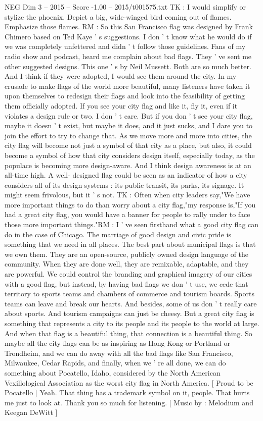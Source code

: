 \begin{textsample}{NEG Dim 3 – 2015 – Score -1.00 – 2015/t001575.txt}
TK : I would simplify or stylize the phoenix.
Depict a big, wide-winged bird coming out of flames.
Emphasize those flames.
RM : So this San Francisco flag was designed by Frank Chimero based on Ted Kaye ' s suggestions.
I don ' t know what he would do if we was completely unfettered and didn ' t follow those guidelines.
Fans of my radio show and podcast, heard me complain about bad flags.
They ' ve sent me other suggested designs.
This one ' s by Neil Mussett.
Both are so much better.
And I think if they were adopted, I would see them around the city.
In my crusade to make flags of the world more beautiful, many listeners have taken it upon themselves to redesign their flags and look into the feasibility of getting them officially adopted.
If you see your city flag and like it, fly it, even if it violates a design rule or two.
I don ' t care.
But if you don ' t see your city flag, maybe it doesn ' t exist, but maybe it does, and it just sucks, and I dare you to join the effort to try to change that.
As we move more and more into cities, the city flag will become not just a symbol of that city as a place, but also, it could become a symbol of how that city considers design itself, especially today, as the populace is becoming more design-aware.
And I think design awareness is at an all-time high.
A well- designed flag could be seen as an indicator of how a city considers all of its design systems : its public transit, its parks, its signage.
It might seem frivolous, but it ' s not.
TK : Often when city leaders say,"We have more important things to do than worry about a city flag,"my response is,"If you had a great city flag, you would have a banner for people to rally under to face those more important things."RM : I ' ve seen firsthand what a good city flag can do in the case of Chicago.
The marriage of good design and civic pride is something that we need in all places.
The best part about municipal flags is that we own them.
They are an open-source, publicly owned design language of the community.
When they are done well, they are remixable, adaptable, and they are powerful.
We could control the branding and graphical imagery of our cities with a good flag, but instead, by having bad flags we don ' t use, we cede that territory to sports teams and chambers of commerce and tourism boards.
Sports teams can leave and break our hearts.
And besides, some of us don ' t really care about sports.
And tourism campaigns can just be cheesy.
But a great city flag is something that represents a city to its people and its people to the world at large.
And when that flag is a beautiful thing, that connection is a beautiful thing.
So maybe all the city flags can be as inspiring as Hong Kong or Portland or Trondheim, and we can do away with all the bad flags like San Francisco, Milwaukee, Cedar Rapids, and finally, when we ' re all done, we can do something about Pocatello, Idaho, considered by the North American Vexillological Association as the worst city flag in North America. [ Proud to be Pocatello ] Yeah.
That thing has a trademark symbol on it, people.
That hurts me just to look at.
Thank you so much for listening. [ Music by : Melodium and Keegan DeWitt ]

\end{textsample}
